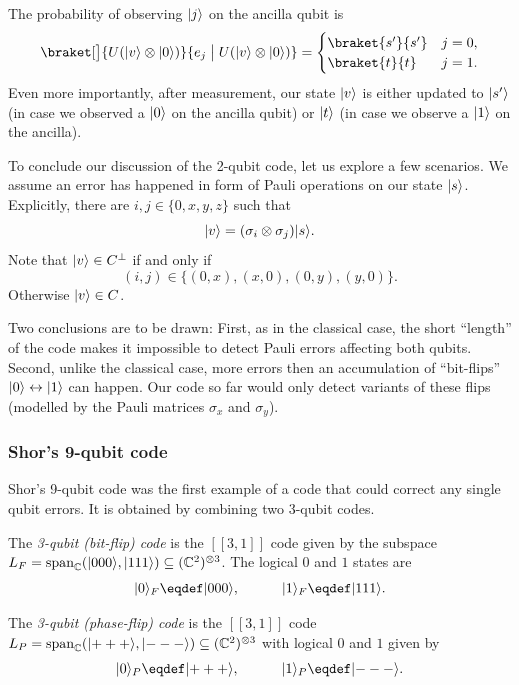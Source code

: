 \documentclass[a4paper, oneside, 12pt]{amsart}
\begin{document}
\begin{remark}
\begin{thmlist}
    The probability of observing  \(\lvert j\rangle\) on the ancilla qubit  is
    \begin{equation*}
      \braket[\big]{U(\ket{v}\otimes \ket{0})}{e_{j}\;\big|\; U(\ket{v}\otimes \ket{0})}
      =
      \begin{cases}
        \braket{s'}{s'} & j =0, \\
        \braket{t}{t} & j = 1.
      \end{cases}
    \end{equation*}
    Even more importantly, after measurement, our state \(\lvert v\rangle\) is  either updated to \(\lvert s'\rangle\) (in case we observed a \(\lvert0\rangle\) on the ancilla qubit) or \(\lvert t\rangle\) (in case we observe a \(\lvert1\rangle\) on the ancilla).
  \end{thmlist}
  To conclude our discussion of the 2-qubit code, let us explore a few scenarios.
  We assume an error has happened in form of Pauli operations on our state \(\lvert s\rangle\).
  Explicitly,  there are \(i,j \in\{0,x,y,z\}\) such that
 \begin{equation*}
    \lvert v\rangle = (\sigma_{i}\otimes \sigma_{j})\lvert s\rangle.
  \end{equation*}
  Note that  \(\lvert v\rangle\in C^{\perp}\) if and only if
  \begin{equation*}
    (i,j) \in\{(0,x),(x,0), (0,y), (y,0)\}.
  \end{equation*}
  Otherwise \(\lvert v\rangle \in C\).

  Two conclusions are to be drawn:
  First, as in the classical case, the short ``length'' of the code makes it impossible to detect Pauli errors affecting both qubits.
  Second, unlike the classical case, more errors then an accumulation of ``bit-flips'' \(\lvert0\rangle \leftrightarrow \lvert1\rangle\) can happen.
  Our code so far would only detect variants of these flips (modelled by the Pauli matrices \(\sigma_{x}\) and \(\sigma_{y}\)).
\end{remark}
\subsubsection{Shor's 9-qubit code}\label{sec:shor's-9-qubit-code}
Shor's 9-qubit code was the first example of a code that could correct any single qubit errors.
It is obtained by combining two 3-qubit codes.
\begin{definition}\label{def:3-qubit-code}
  The \emph{3-qubit (bit-flip) code} is the \([[3,1]]\) code given by the subspace \(L_{F} = \operatorname{span}_{ \mathbb{C}}(\lvert000\rangle , \lvert111\rangle)\subseteq (\mathbb{C}^{2})^{\otimes 3}\).
  The logical \(0\) and \(1\) states are
  \begin{equation}
    \ket{0}_{F} \eqdef \ket{000}, \qquad\quad
    \ket{1}_{F} \eqdef \ket{111}.
  \end{equation}

  The  \emph{3-qubit (phase-flip) code} is the \([[3,1]]\) code \(L_{P} = \operatorname{span}_{ \mathbb{C}}(\lvert+++\rangle , \lvert---\rangle)\subseteq (\mathbb{C}^{2})^{\otimes 3}\) with logical \(0\) and \(1\) given by
  \begin{equation}
    \ket{0}_{P} \eqdef \ket{+++}, \qquad\quad
    \ket{1}_{P} \eqdef \ket{---}.
  \end{equation}
\end{definition}
\end{document}
